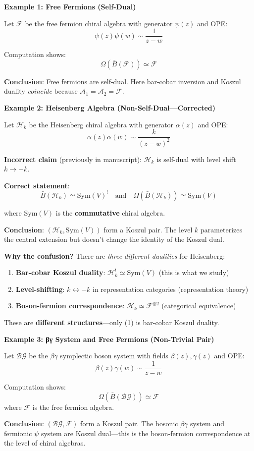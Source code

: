 \begin{example}
\label{ex:three-koszul-instances}

\textbf{Example 1: Free Fermions (Self-Dual)}

Let $\mathcal{F}$ be the free fermion chiral algebra with generator $\psi(z)$ and OPE:
$$\psi(z)\psi(w) \sim \frac{1}{z-w}$$

Computation shows:
$$\Omega(\bar{B}(\mathcal{F})) \simeq \mathcal{F}$$

\textbf{Conclusion}: Free fermions are self-dual. Here bar-cobar inversion and Koszul 
duality \emph{coincide} because $\mathcal{A}_1 = \mathcal{A}_2 = \mathcal{F}$.

\textbf{Example 2: Heisenberg Algebra (Non-Self-Dual—Corrected)}

Let $\mathcal{H}_k$ be the Heisenberg chiral algebra with generator $\alpha(z)$ and OPE:
$$\alpha(z)\alpha(w) \sim \frac{k}{(z-w)^2}$$

\textbf{Incorrect claim} (previously in manuscript): $\mathcal{H}_k$ is self-dual with 
level shift $k \to -k$.

\textbf{Correct statement}: 
$$\bar{B}(\mathcal{H}_k) \simeq \text{Sym}(V)^! \quad \text{and} \quad 
  \Omega(\bar{B}(\mathcal{H}_k)) \simeq \text{Sym}(V)$$

where $\text{Sym}(V)$ is the \textbf{commutative} chiral algebra.

\textbf{Conclusion}: $(\mathcal{H}_k, \text{Sym}(V))$ form a Koszul pair. The level $k$ 
parameterizes the central extension but doesn't change the identity of the Koszul dual.

\textbf{Why the confusion?} There are \emph{three different dualities} for Heisenberg:
\begin{enumerate}
\item \textbf{Bar-cobar Koszul duality}: $\mathcal{H}_k^! \simeq \text{Sym}(V)$ 
      (this is what we study)
\item \textbf{Level-shifting}: $k \leftrightarrow -k$ in representation categories 
      (representation theory)
\item \textbf{Boson-fermion correspondence}: $\mathcal{H}_k \simeq \mathcal{F}^{\otimes 2}$ 
      (categorical equivalence)
\end{enumerate}
These are \textbf{different structures}—only (1) is bar-cobar Koszul duality.

\textbf{Example 3: βγ System and Free Fermions (Non-Trivial Pair)}

Let $\mathcal{BG}$ be the $\beta\gamma$ symplectic boson system with fields $\beta(z), \gamma(z)$ 
and OPE:
$$\beta(z)\gamma(w) \sim \frac{1}{z-w}$$

Computation shows:
$$\Omega(\bar{B}(\mathcal{BG})) \simeq \mathcal{F}$$
where $\mathcal{F}$ is the free fermion algebra.

\textbf{Conclusion}: $(\mathcal{BG}, \mathcal{F})$ form a Koszul pair. The bosonic $\beta\gamma$ 
system and fermionic $\psi$ system are Koszul dual—this is the boson-fermion correspondence 
at the level of chiral algebras.
\end{example}

